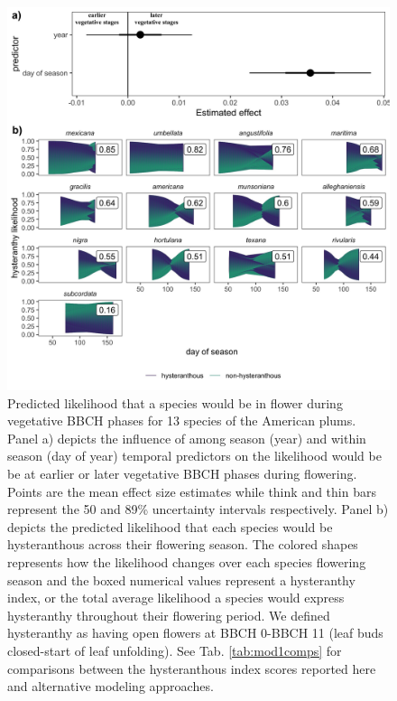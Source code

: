 \documentclass{article}[12pt]
\begin{document}
\begin{figure}[h!]
    \centering
 \includegraphics[width=\textwidth]{..//..//Plots/whatReviwerswant/sps_preds.jpeg}
    \caption{Predicted likelihood that a species would be in flower during vegetative BBCH phases for 13 species of the American plums. Panel a) depicts the influence of among season (year) and within season (day of year) temporal predictors on the likelihood would be be at earlier or later vegetative BBCH phases during flowering. Points are the mean effect size estimates while think and thin bars represent the 50 and 89\% uncertainty intervals respectively. Panel b) depicts the predicted likelihood that each species would be hysteranthous across their flowering season. The colored shapes represents how the likelihood changes over each species flowering season and the boxed numerical values represent a hysteranthy index, or the total average likelihood a species would express hysteranthy throughout their flowering period. We defined hysteranthy as having open flowers at BBCH 0-BBCH 11 (leaf buds closed-start of leaf unfolding). See Tab. \ref{tab:mod1comps} for comparisons between the hysteranthous index scores reported here and alternative modeling approaches. }
    \label{fig:ordinals}
\end{figure}
\end{document}
